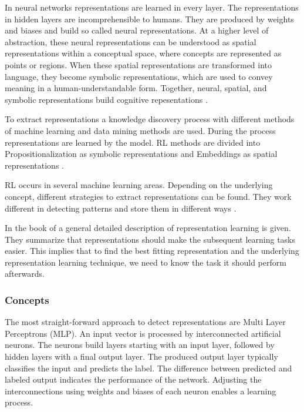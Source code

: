 In neural networks representations are learned in every layer. The representations in hidden layers are incomprehensible to humans. They are produced by weights and biases and build so called neural representations. At a higher level of abstraction, these neural representations can be understood as spatial representations within a conceptual space, where concepts are represented as points or regions. When these spatial representations are transformed into language, they become symbolic representations, which are used to convey meaning in a human-understandable form. Together, neural, spatial, and symbolic representations build cognitive repesentations \cite{gardenfors_conceptual_2000}.

To extract representations a knowledge discovery process with different methods of machine learning and data mining methods are used. During the process representations are learned by the model. RL methods are divided into Propositionalization as symbolic representations and Embeddings as spatial representations \cite[p. 4]{lavrac_representation_2021}.

RL occurs in several machine learning areas. Depending on the underlying concept, different strategies to extract representations can be found. They work different in detecting patterns and store them in different ways \cite{bishop_pattern_2006}.

In the book of \cite[p. 525]{goodfellow_deep_2016} a general detailed description of representation learning is given. They summarize that representations should make the subsequent learning tasks easier. This implies that to find the best fitting representation and the underlying representation learning technique, we need to know the task it should perform afterwards.
\subsubsection{Concepts}
The most straight-forward approach to detect representations are Multi Layer Perceptrons (MLP). An input vector is processed by interconnected artificial neurons. The neurons build layers starting with an input layer, followed by hidden layers with a final output layer. The produced output layer typically classifies the input and predicts the label. The difference between predicted and labeled output indicates the performance of the network. Adjusting the interconnections using weights and biases of each neuron enables a learning process. \cite{nielsen_neural_2015}

